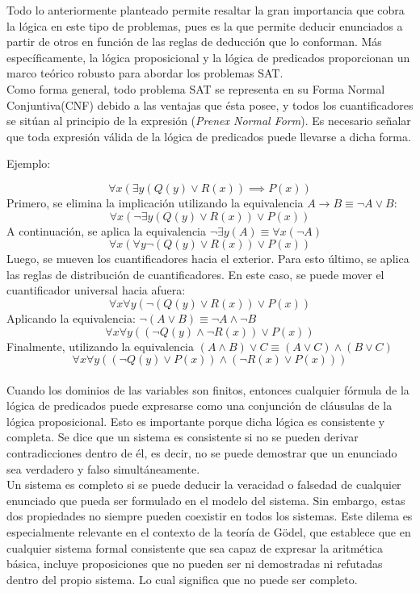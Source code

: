 \documentclass[12pt]{report}
\begin{document}
Todo lo anteriormente planteado permite resaltar la gran importancia que cobra la lógica en este tipo de problemas, pues es la que permite deducir enunciados a partir de otros en función de las reglas de deducción que lo conforman. Más específicamente, la lógica proposicional y la lógica de predicados proporcionan un marco teórico robusto para abordar los problemas SAT.\\

Como forma general, todo problema SAT se representa en su Forma Normal Conjuntiva(CNF) debido a las ventajas que ésta posee, y todos los cuantificadores se sitúan al principio de la expresión (\textit{Prenex Normal Form}). Es necesario señalar que toda expresión válida de la lógica de predicados puede llevarse a dicha forma.

Ejemplo:

$$\forall x(\exists y(Q(y)\lor R(x))\implies P(x))$$
Primero, se elimina la implicación utilizando la equivalencia $A→B\equiv \neg A\lor B$:
$$\forall x(\neg\exists y(Q(y)\lor R(x)) \lor  P(x))$$
A continuación, se aplica la equivalencia $\neg\exists y(A)\equiv \forall x(\neg A)$
$$\forall x(\forall y\neg(Q(y)\lor R(x)) \lor  P(x))$$
Luego, se mueven los cuantificadores hacia el exterior. Para esto último, se aplica las reglas de distribución de cuantificadores. En este caso, se puede mover el cuantificador universal hacia afuera:
$$\forall x\forall y(\neg(Q(y)\lor R(x))\lor  P(x))$$
Aplicando la equivalencia: $\neg(A\lor B)\equiv \neg A\land\neg B$
$$\forall x\forall y((\neg Q(y)\land\neg R(x))\lor  P(x))$$
Finalmente, utilizando la equivalencia $(A\land B)\lor C\equiv (A\lor C)\land(B\lor C)$
$$\forall x\forall y((\neg Q(y)\lor  P(x))\land(\neg R(x)\lor  P(x)))$$\\

Cuando los dominios de las variables son finitos, entonces cualquier fórmula de la lógica de predicados puede expresarse como una conjunción de cláusulas de la lógica proposicional. Esto es importante porque dicha lógica es consistente y completa. Se dice que un sistema es consistente si no se pueden derivar contradicciones dentro de él, es decir, no se puede demostrar que un enunciado sea verdadero y falso simultáneamente. \\

Un sistema es completo si se puede deducir la veracidad o falsedad de cualquier enunciado que pueda ser formulado en el modelo del sistema. Sin embargo, estas dos propiedades no siempre pueden coexistir en todos los sistemas. Este dilema es especialmente relevante en el contexto de la teoría de Gödel, que establece que en cualquier sistema formal consistente que sea capaz de expresar la aritmética básica, incluye proposiciones que no pueden ser ni demostradas ni refutadas dentro del propio sistema. Lo cual significa que no puede ser completo.\\
\end{document}

